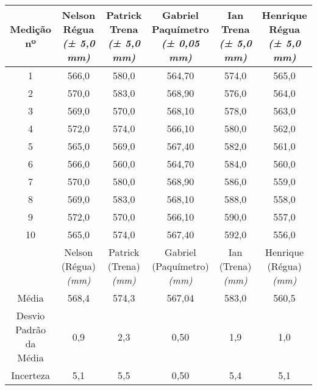 \documentclass{article}
\begin{document}
\begin{table}[h!]
\centering
\begin{tabular}{c c c c c c }
\toprule
Medição nº & \shortstack{Nelson\\Régua\\\textit{(± 5,0 mm)}} & \shortstack{Patrick\\Trena\\\textit{(± 5,0 mm)}} & \shortstack{Gabriel\\Paquímetro\\\textit{(± 0,05 mm)}} & \shortstack{Ian\\Trena\\\textit{(± 5,0 mm)}} & \shortstack{Henrique\\Régua\\\textit{(± 5,0 mm)}}\\
\midrule
1 & 566,0 & 580,0 & 564,70 & 574,0 & 565,0\\
2 & 570,0 & 583,0 & 568,90 & 576,0 & 564,0\\
3 & 569,0 & 570,0 & 568,10 & 578,0 & 563,0\\
4 & 572,0 & 574,0 & 566,10 & 580,0 & 562,0\\
5 & 565,0 & 569,0 & 567,40 & 582,0 & 561,0\\
6 & 566,0 & 560,0 & 564,70 & 584,0 & 560,0\\
7 & 570,0 & 580,0 & 568,90 & 586,0 & 559,0\\
8 & 569,0 & 583,0 & 568,10 & 588,0 & 558,0\\
9 & 572,0 & 570,0 & 566,10 & 590,0 & 557,0\\
10 & 565,0 & 574,0 & 567,40 & 592,0 & 556,0\\
\midrule
&\shortstack{Nelson\\(Régua)\\\textit{(mm)}} & \shortstack{Patrick\\(Trena)\\\textit{(mm)}} & \shortstack{Gabriel\\(Paquímetro)\\\textit{(mm)}} & \shortstack{Ian\\(Trena)\\\textit{(mm)}} & \shortstack{Henrique\\(Régua)\\\textit{(mm)}}\\
\midrule
Média & 568,4 & 574,3 & 567,04 & 583,0 & 560,5\\[3pt]
\shortstack{Desvio\\Padrão da\\Média} & 0,9 & 2,3 & 0,50 & 1,9 & 1,0\\[3pt]
Incerteza & 5,1 & 5,5 & 0,50 & 5,4 & 5,1\\
\bottomrule
\end{tabular}
\end{table}
\end{document}
